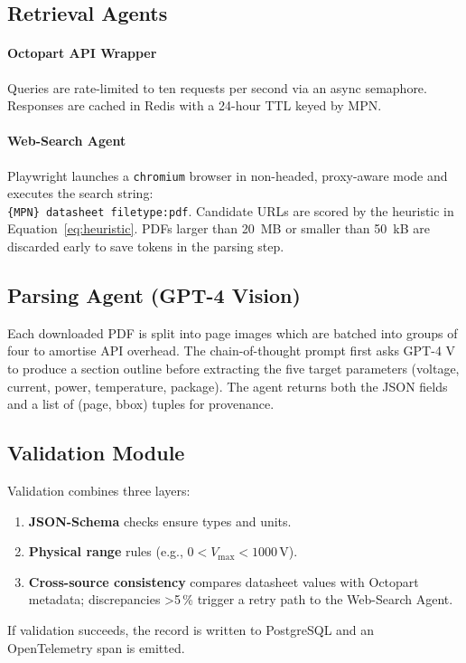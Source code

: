 \subsection{Retrieval Agents}
\paragraph{Octopart API Wrapper}  Queries are rate-limited to ten requests per second via an async semaphore.  Responses are cached in Redis with a 24-hour TTL keyed by MPN.

\paragraph{Web-Search Agent}  Playwright launches a \texttt{chromium} browser in non-headed, proxy-aware mode and executes the search string:\\
\texttt{\{MPN\} datasheet filetype:pdf}.  Candidate URLs are scored by the heuristic in Equation~\ref{eq:heuristic}.  PDFs larger than 20~MB or smaller than 50~kB are discarded early to save tokens in the parsing step.

\subsection{Parsing Agent (GPT-4 Vision)}
Each downloaded PDF is split into page images which are batched into groups of four to amortise API overhead.  The chain-of-thought prompt first asks GPT-4 V to produce a section outline before extracting the five target parameters (voltage, current, power, temperature, package).  The agent returns both the JSON fields and a list of (page, bbox) tuples for provenance.

\subsection{Validation Module}
Validation combines three layers:
\begin{enumerate}
  \item \textbf{JSON-Schema} checks ensure types and units.
  \item \textbf{Physical range} rules (e.g., $0< V_{\max}<1000\,\mathrm{V}$).
  \item \textbf{Cross-source consistency} compares datasheet values with Octopart metadata; discrepancies >5\,\% trigger a retry path to the Web-Search Agent.
\end{enumerate}
If validation succeeds, the record is written to PostgreSQL and an OpenTelemetry span is emitted.

